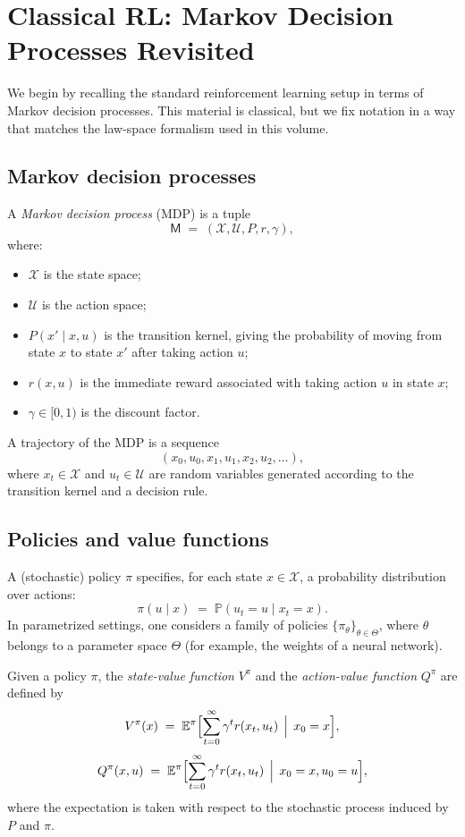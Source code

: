 \documentclass[11pt]{book}
\theoremstyle{plain}
\theoremstyle{definition}
\theoremstyle{remark}
\begin{document}
\section{Classical RL: Markov Decision Processes Revisited}
\label{sec:classical-rl-mdp}


We begin by recalling the standard reinforcement learning setup in
terms of Markov decision processes. This material is classical, but
we fix notation in a way that matches the law-space formalism used
in this volume.

\subsection*{Markov decision processes}

A \emph{Markov decision process} (MDP) is a tuple
\[
   \mathsf{M} \;=\;
   (\mathcal{X}, \mathcal{U}, P, r, \gamma),
\]
where:
\begin{itemize}
  \item $\mathcal{X}$ is the state space;
  \item $\mathcal{U}$ is the action space;
  \item $P(x' \mid x,u)$ is the transition kernel, giving the
        probability of moving from state $x$ to state $x'$ after
        taking action $u$;
  \item $r(x,u)$ is the immediate reward associated with taking
        action $u$ in state $x$;
  \item $\gamma \in [0,1)$ is the discount factor.
\end{itemize}

A trajectory of the MDP is a sequence
\[
   (x_0,u_0,x_1,u_1,x_2,u_2,\dots),
\]
where $x_t \in \mathcal{X}$ and $u_t \in \mathcal{U}$ are random
variables generated according to the transition kernel and a
decision rule.

\subsection*{Policies and value functions}

A (stochastic) policy $\pi$ specifies, for each state $x \in
\mathcal{X}$, a probability distribution over actions:
\[
   \pi(u \mid x) \;=\; \mathbb{P}(u_t = u \mid x_t = x).
\]
In parametrized settings, one considers a family of policies
$\{\pi_\theta\}_{\theta \in \Theta}$, where $\theta$ belongs to a
parameter space $\Theta$ (for example, the weights of a neural
network).

Given a policy $\pi$, the \emph{state-value function} $V^\pi$ and
the \emph{action-value function} $Q^\pi$ are defined by
\[
   V^\pi(x)
   \;=\;
   \mathbb{E}^\pi\Bigl[\sum_{t=0}^\infty
   \gamma^t r(x_t,u_t)\,\Bigm\vert\,x_0=x\Bigr],
\]
\[
   Q^\pi(x,u)
   \;=\;
   \mathbb{E}^\pi\Bigl[\sum_{t=0}^\infty
   \gamma^t r(x_t,u_t)\,\Bigm\vert\,x_0=x,u_0=u\Bigr],
\]
where the expectation is taken with respect to the stochastic
process induced by $P$ and $\pi$.
\end{document}
